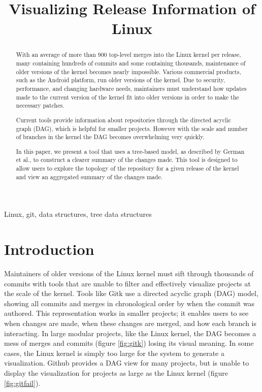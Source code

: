 \documentclass[conference, draftclsnofoot]{IEEEtran}
\makeatletter
\newcommand{\TheTitle}{Visualizing Release Information of Linux}
\newcommand{\TheAuthors}{Evan Wilde}
\newcommand{\TheEmails}{etcwilde@uvic.ca}
\newcommand{\TheKeywords}{Linux, git, data structures, tree data structures}
\makeatother
\begin{document}
\title{\TheTitle}
\author{
\IEEEauthorblockA{\TheAuthors}
\IEEEauthorblockA{Email: \TheEmails}
}
\maketitle
\begin{abstract}

        With an average of more than 900 top-level merges into the Linux kernel per
        release, many containing hundreds of commits and some containing thousands,
        maintenance of older versions of the kernel becomes nearly impossible.
        Various commercial products, such as the Android platform, run older
        versions of the kernel. Due to security, performance, and changing hardware
        needs, maintainers must understand how updates made to the current version
        of the kernel fit into older versions in order to make the necessary
        patches.

        Current tools provide information about repositories through the directed
        acyclic graph (DAG), which is helpful for smaller projects. However with the
        scale and number of branches in the kernel the DAG becomes overwhelming very
        quickly.

        In this paper, we present a tool that uses a tree-based model, as described
        by German et al., to construct a clearer summary of the changes made. This
        tool is designed to allow users to explore the topology of the repository
        for a given release of the kernel and view an aggregated summary of the
        changes made.

\end{abstract}

\begin{IEEEkeywords}
\TheKeywords
\end{IEEEkeywords}

\section{Introduction}

Maintainers of older versions of the Linux kernel must sift through thousands of
commits with tools that are unable to filter and effectively visualize projects at
the scale of the kernel. Tools like Gitk use a directed acyclic graph (DAG) model,
showing all commits and merges in chronological order by when the commit was
authored. This representation works in smaller projects; it enables users to see
when changes are made, when these changes are merged, and how each branch is
interacting.  In large modular projects, like the Linux kernel, the DAG becomes a
mess of merges and commits (figure \ref{fig:gitk}) losing its visual meaning. In
some cases, the Linux kernel is simply too large for the system to generate a
visualization. Github provides a DAG view for many projects, but is unable to
display the visualization for projects as large as the Linux kernel (figure
\ref{fig:gitfail}).
\end{document}
